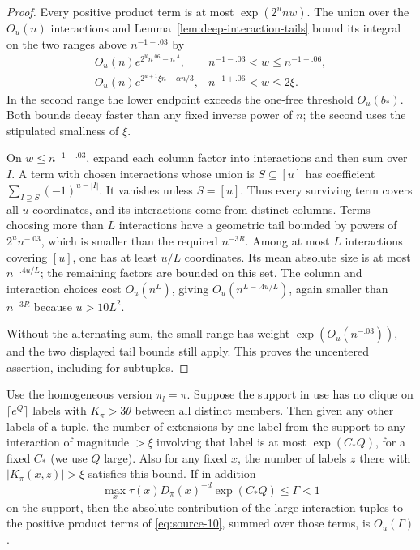 \begin{proof}
Every positive product term is at most \(\exp(2^u n w)\). The union over the \(O_u(n)\) interactions and Lemma~\ref{lem:deep-interaction-tails} bound its integral on the two ranges above \(n^{-1-.03}\) by
\[
 \begin{array}{ll}
 O_u(n)e^{2^u n^{.06}-n^{.4}},
   & n^{-1-.03}<w\le n^{-1+.06},\\
 O_u(n)e^{2^{u+1}\xi n-\alpha n/3},
   & n^{-1+.06}<w\le2\xi.
 \end{array}
\]
In the second range the lower endpoint exceeds the one-free threshold \(O_u(b_*)\). Both bounds decay faster than any fixed inverse power of \(n\); the second uses the stipulated smallness of \(\xi\).

On \(w\le n^{-1-.03}\), expand each column factor into interactions and then sum over \(I\). A term with chosen interactions whose union is \(S\subseteq[u]\) has coefficient \(\sum_{I\supseteq S}(-1)^{u-|I|}\). It vanishes unless \(S=[u]\). Thus every surviving term covers all \(u\) coordinates, and its interactions come from distinct columns. Terms choosing more than \(L\) interactions have a geometric tail bounded by powers of \(2^u n^{-.03}\), which is smaller than the required \(n^{-3R}\). Among at most \(L\) interactions covering \([u]\), one has at least \(u/L\) coordinates. Its mean absolute size is at most \(n^{-.4u/L}\); the remaining factors are bounded on this set. The column and interaction choices cost \(O_u(n^L)\), giving \(O_u(n^{L-.4u/L})\), again smaller than \(n^{-3R}\) because \(u>10L^2\).

Without the alternating sum, the small range has weight \(\exp(O_u(n^{-.03}))\), and the two displayed tail bounds still apply. This proves the uncentered assertion, including for subtuples.
\end{proof}

\begin{lemma}\label{lem:homogeneous-peeling}
Use the homogeneous version \(\pi_l=\pi\). Suppose the support in use has no clique on \(\lceil e^Q\rceil\) labels with \(K_\pi>3\theta\) between all distinct members. Then given any other labels of a tuple, the number of extensions by one label from the support to any interaction of magnitude \(>\xi\) involving that label is at most \(\exp(C_* Q)\), for a fixed \(C_*\) (we use \(Q\) large). Also for any fixed \(x\), the number of labels \(z\) there with \(|K_\pi(x,z)|>\xi\) satisfies this bound. If in addition
\[
 \max_x\tau(x)D_\pi(x)^{-d}\exp(C_*Q)\le\Gamma<1
\]
on the support, then the absolute contribution of the large-interaction tuples to the positive product terms of \eqref{eq:source-10}, summed over those terms, is \(O_u(\Gamma)\).
\end{lemma}

